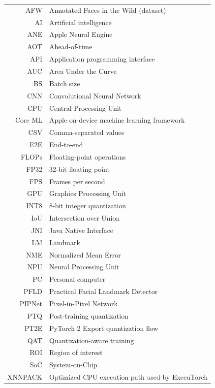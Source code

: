 \documentclass[english,bachelor,oneside]{ctufit-thesis}
\begin{document}
\begin{tabular}{rl}
	AFW      & Annotated Faces in the Wild (dataset) \\
	AI       & Artificial intelligence \\
	ANE      & Apple Neural Engine \\
	AOT      & Ahead-of-time \\
	API      & Application programming interface \\
	AUC      & Area Under the Curve \\
	BS       & Batch size \\
	CNN      & Convolutional Neural Network \\
	CPU      & Central Processing Unit \\
	Core ML  & Apple on-device machine learning framework \\
	CSV      & Comma-separated values \\
	E2E      & End-to-end \\
	FLOPs    & Floating-point operations \\
	FP32     & 32-bit floating point \\
	FPS      & Frames per second \\
	GPU      & Graphics Processing Unit \\
	INT8     & 8-bit integer quantization \\
	IoU      & Intersection over Union \\
	JNI      & Java Native Interface \\
	LM       & Landmark \\
	NME      & Normalized Mean Error \\
	NPU      & Neural Processing Unit \\
	PC       & Personal computer \\
	PFLD     & Practical Facial Landmark Detector \\
	PIPNet   & Pixel-in-Pixel Network \\
	PTQ      & Post-training quantization \\
	PT2E     & PyTorch 2 Export quantization flow \\
	QAT      & Quantization-aware training \\
	ROI      & Region of interest \\
	SoC      & System-on-Chip \\
	XNNPACK  & Optimized CPU execution path used by ExecuTorch \\
\end{tabular}
\resumeTOCentries
\mainmatter\mainmatterinit %
\end{document}
